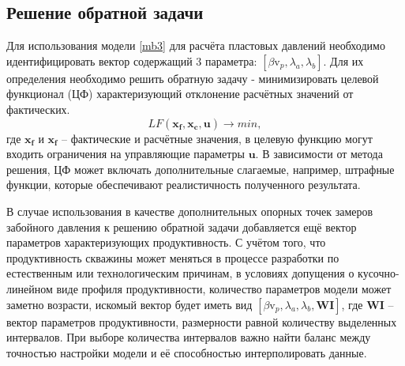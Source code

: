 \documentclass[14pt]{article}
\begin{document}
\subsection{Решение обратной задачи} 
Для использования модели \ref{mb3} для расчёта пластовых давлений необходимо идентифицировать вектор содержащий 3 параметра: $[\beta \mathrm{v}_p, \lambda_a, \lambda_b]$. Для их определения необходимо решить обратную задачу - минимизировать целевой функционал (ЦФ) характеризующий отклонение расчётных значений от фактических.
\begin{equation}\label{lf_min}
	LF(\boldsymbol{x_f}, \boldsymbol{x_c}, \boldsymbol{u})  \rightarrow min,
\end{equation}
где $\boldsymbol{x_f}$ и $\boldsymbol{x_f}$ -- фактические и расчётные значения, в целевую функцию могут входить ограничения на управляющие параметры $\boldsymbol{u}$.
 В зависимости от метода решения, ЦФ может включать дополнительные слагаемые, например, штрафные функции, которые обеспечивают реалистичность полученного результата. 
 
 В случае использования в качестве дополнительных опорных точек замеров забойного давления к решению обратной задачи добавляется ещё вектор параметров характеризующих продуктивность. С учётом того, что продуктивность скважины может меняться в процессе разработки по естественным или технологическим причинам, в условиях допущения о кусочно-линейном виде профиля продуктивности, количество параметров модели может заметно возрасти, искомый вектор будет иметь вид $[\beta \mathrm{v}_p, \lambda_a, \lambda_b, \boldsymbol{WI}]$, где $\boldsymbol{WI}$ -- вектор параметров продуктивности, размерности равной количеству выделенных интервалов. При выборе количества интервалов важно найти баланс между точностью настройки модели и её способностью интерполировать данные.
\end{document}
